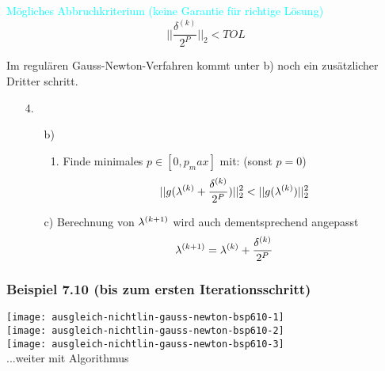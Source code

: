 \textcolor{cyan}{Mögliches Abbruchkriterium (keine Garantie für richtige Lösung)}\\
{\large
$$|| \frac{\delta^{(k)}}{2^P} ||_2 < TOL$$
}

Im regulären Gauss-Newton-Verfahren kommt unter b) noch ein zusätzlicher Dritter schritt.

	{\large
		\begin{enumerate}
			\item[4.]
				\begin{enumerate}
					\item[b)]
						\begin{enumerate}[resume=gauss-newton-inner]
							\item Finde minimales $p \in [0, p_max]$ mit: (sonst $p = 0$)
							      $$||g(\lambda^{(k)} + \frac{\delta^{(k)}}{2^P})||_2^2 < ||g(\lambda^{(k)})||_2^2$$
						\end{enumerate}
					\item[c)] Berechnung von $\lambda^{(k+1)}$ wird auch dementsprechend angepasst
						$$\lambda^{(k+1)} = \lambda^{(k)} + \frac{\delta^{(k)}}{2^P}$$
				\end{enumerate}
		\end{enumerate}
	}



\subsubsection{Beispiel 7.10 (bis zum ersten Iterationsschritt)}


\texttt{[image: ausgleich-nichtlin-gauss-newton-bsp610-1]}\\
\texttt{[image: ausgleich-nichtlin-gauss-newton-bsp610-2]}\\
\texttt{[image: ausgleich-nichtlin-gauss-newton-bsp610-3]}\\
...weiter mit Algorithmus





